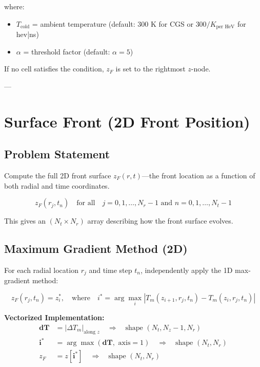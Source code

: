 \documentclass[11pt]{article}
\begin{document}
\noindent where:
\begin{itemize}
\item $T_{\text{cold}}$ = ambient temperature (default: 300 K for CGS or $300 / K_{\text{per HeV}}$ for hev|ns)
\item $\alpha$ = threshold factor (default: $\alpha = 5$)
\end{itemize}

\noindent If no cell satisfies the condition, $z_F$ is set to the rightmost $z$-node.

---

\section{Surface Front (2D Front Position)}

\subsection{Problem Statement}

Compute the full 2D front surface $z_F(r,t)$---the front location as a function of both radial and time coordinates.

\begin{equation}
z_F(r_j, t_n) \quad \text{for all} \quad j = 0, 1, \ldots, N_r-1 \text{ and } n = 0, 1, \ldots, N_t-1
\end{equation}

\noindent This gives an $(N_t \times N_r)$ array describing how the front surface evolves.

\subsection{Maximum Gradient Method (2D)}

For each radial location $r_j$ and time step $t_n$, independently apply the 1D max-gradient method:

\begin{equation}
z_F(r_j,t_n) = z_i^*,  \quad \text{where} \quad i^* = \arg\max_i \left| T_m(z_{i+1},r_j,t_n) - T_m(z_i,r_j,t_n) \right|
\end{equation}

\noindent \textbf{Vectorized Implementation:}
\begin{align}
\mathbf{dT} &= |\Delta T_m|_{\text{along } z} \quad \Rightarrow \quad \text{shape } (N_t, N_z-1, N_r) \\
\mathbf{i}^* &= \arg\max(\mathbf{dT}, \text{ axis}=1) \quad \Rightarrow \quad \text{shape } (N_t, N_r) \\
z_F &= z[\mathbf{i}^*] \quad \Rightarrow \quad \text{shape } (N_t, N_r)
\end{align}
\end{document}
